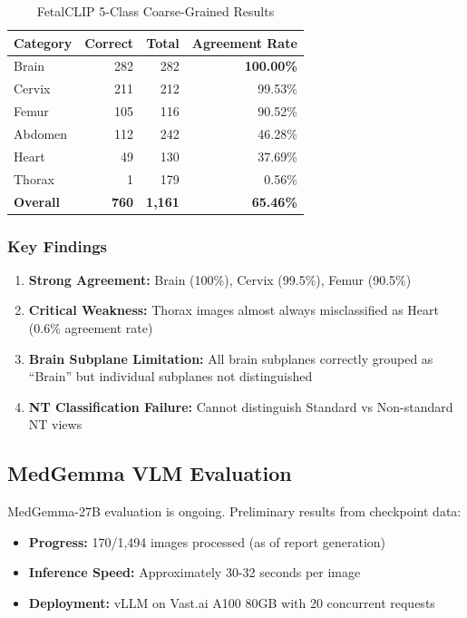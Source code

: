 \documentclass[11pt,a4paper]{article}
\begin{document}
\begin{table}[H]
\centering
\caption{FetalCLIP 5-Class Coarse-Grained Results}
\begin{tabular}{lrrr}
\toprule
\textbf{Category} & \textbf{Correct} & \textbf{Total} & \textbf{Agreement Rate} \\
\midrule
Brain & 282 & 282 & \textbf{100.00\%} \\
Cervix & 211 & 212 & 99.53\% \\
Femur & 105 & 116 & 90.52\% \\
Abdomen & 112 & 242 & 46.28\% \\
Heart & 49 & 130 & 37.69\% \\
Thorax & 1 & 179 & 0.56\% \\
\midrule
\textbf{Overall} & \textbf{760} & \textbf{1,161} & \textbf{65.46\%} \\
\bottomrule
\end{tabular}
\end{table}

\subsubsection{Key Findings}

\begin{enumerate}
    \item \textbf{Strong Agreement:} Brain (100\%), Cervix (99.5\%), Femur (90.5\%)
    \item \textbf{Critical Weakness:} Thorax images almost always misclassified as Heart (0.6\% agreement rate)
    \item \textbf{Brain Subplane Limitation:} All brain subplanes correctly grouped as ``Brain'' but individual subplanes not distinguished
    \item \textbf{NT Classification Failure:} Cannot distinguish Standard vs Non-standard NT views
\end{enumerate}

\subsection{MedGemma VLM Evaluation}

MedGemma-27B evaluation is ongoing. Preliminary results from checkpoint data:

\begin{itemize}
    \item \textbf{Progress:} 170/1,494 images processed (as of report generation)
    \item \textbf{Inference Speed:} Approximately 30-32 seconds per image
    \item \textbf{Deployment:} vLLM on Vast.ai A100 80GB with 20 concurrent requests
\end{itemize}
\end{document}
